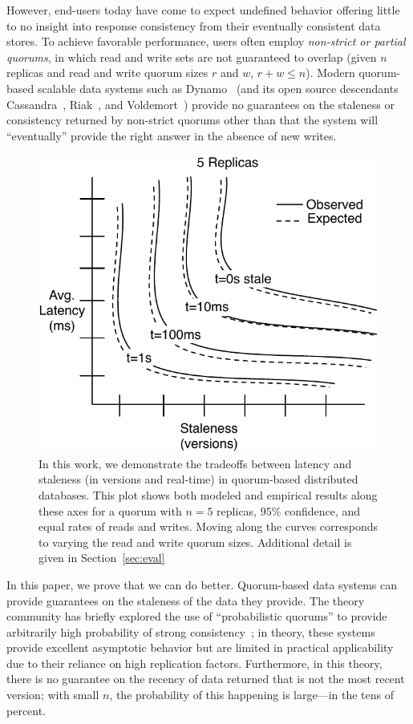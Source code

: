 \documentclass{vldb}
\begin{document}
However, end-users today have come to expect undefined behavior
offering little to no insight into response consistency from their
eventually consistent data stores.  To achieve favorable performance,
users often employ \textit{non-strict or partial quorums}, in which
read and write sets are not guaranteed to overlap (given $n$ replicas
and read and write quorum sizes $r$ and $w$, $r+w \leq n$).  Modern
quorum-based scalable data systems such as Dynamo~\cite{dynamo} (and
its open source descendants Cassandra~\cite{cassandra},
Riak~\cite{riak}, and Voldemort~\cite{voldemort}) provide no
guarantees on the staleness or consistency returned by non-strict
quorums other than that the system will ``eventually'' provide the
right answer in the absence of new writes.


\begin{figure}
\includegraphics[width=.8\columnwidth]{figs/latency-stale.pdf}
\caption{In this work, we demonstrate the tradeoffs between latency
  and staleness (in versions and real-time) in quorum-based
  distributed databases.  This plot shows both modeled and empirical
  results along these axes for a quorum with $n=5$ replicas, $95\%$
  confidence, and equal rates of reads and writes. Moving along the
  curves corresponds to varying the read and write quorum
  sizes. Additional detail is given in Section~\ref{sec:eval}}
\label{fig:latency-staleness}
\end{figure}

In this paper, we prove that we can do better. Quorum-based data systems
can provide guarantees on the staleness of the data they provide. The
theory community has briefly explored the use of ``probabilistic
quorums'' to provide arbitrarily high probability of strong
consistency~\cite{prob-quorum}; in theory, these systems provide
excellent asymptotic behavior but are limited in practical
applicability due to their reliance on high replication factors.
Furthermore, in this theory, there is no guarantee on the recency of
data returned that is not the most recent version; with small $n$,
the probability of this happening is large---in the tens of percent.
\end{document}
